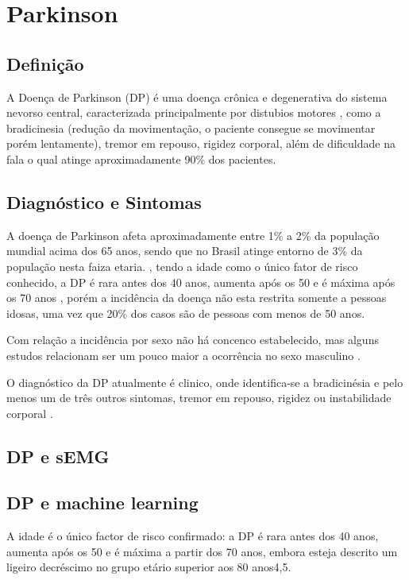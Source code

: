 \chapter{Parkinson}
\section{Definição}
A Doença de Parkinson (DP) é uma doença crônica e
degenerativa do sistema nevorso central, caracterizada principalmente por distubios motores \cite{souzametodos}, como a bradicinesia 
(redução da movimentação, o paciente consegue se movimentar porém lentamente), tremor em repouso, rigidez corporal, além de dificuldade na 
fala o qual atinge aproximadamente 90\% dos pacientes\cite{da2016aspectos}.

\section{Diagnóstico e Sintomas}
A doença de Parkinson afeta aproximadamente entre 1\% a 2\% da população mundial acima dos 65 anos, sendo que no 
Brasil atinge entorno de 3\% da população nesta faiza etaria.  
\cite{magalhaes2009descobrindo}, tendo a idade como o único fator de risco conhecido, a DP é rara antes dos 40 anos, 
aumenta após os 50 e é máxima após os 70 anos
 \cite{peixinho2006alteraccoes}, porém a incidência da doença não esta restrita somente a pessoas idosas,
  uma vez que 20\% dos casos são de pessoas com menos de 50 anos. \cite{gago2014manual}

Com relação a incidência por sexo não há concenco estabelecido, mas alguns estudos relacionam ser um pouco maior a ocorrência 
no sexo masculino \cite{peixinho2006alteraccoes}.

O diagnóstico da DP atualmente é clinico, onde identifica-se a bradicinésia e pelo menos um de três outros sintomas,
 tremor em repouso, rigidez ou instabilidade corporal \cite{peixinho2006alteraccoes}.
\section{DP e sEMG}
\section{DP e machine learning}


A idade é o único factor de risco confirmado:
a DP é rara antes dos 40 anos, aumenta
após os 50 e é máxima a partir dos 70 anos,
embora esteja descrito um ligeiro decréscimo
no grupo etário superior aos 80 anos4,5.
